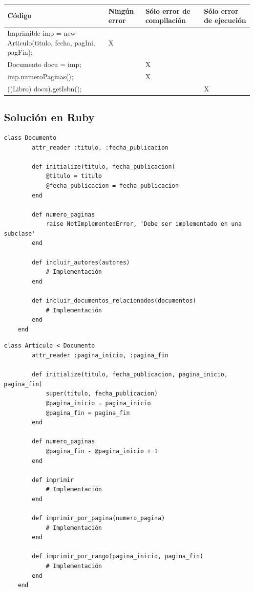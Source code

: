 \documentclass[a4paper,12pt]{article}
\begin{document}
\begin{table}[H]
    \centering
    \begin{tabular}{|p{4cm}|p{4cm}|p{4cm}|p{4cm}|}
        \hline
        \textbf{Código} & \textbf{Ningún error} & \textbf{Sólo error de compilación} & \textbf{Sólo error de ejecución} \\ \hline
        Imprimible imp = new Articulo(titulo, fecha, pagIni, pagFin); & X &  &  \\ \hline
        Documento docu = imp; &  & X &  \\ \hline
        imp.numeroPaginas(); &  & X &  \\ \hline
        ((Libro) docu).getIsbn(); &  &  & X \\ \hline
    \end{tabular}
\end{table}

\subsection{Solución en Ruby}

\begin{lstlisting}[style=customrb, caption={Clase Documento (cabecera, atributos y cabeceras de los métodos)}]
    class Documento
        attr_reader :titulo, :fecha_publicacion

        def initialize(titulo, fecha_publicacion)
            @titulo = titulo
            @fecha_publicacion = fecha_publicacion
        end

        def numero_paginas
            raise NotImplementedError, 'Debe ser implementado en una subclase'
        end

        def incluir_autores(autores)
            # Implementación
        end

        def incluir_documentos_relacionados(documentos)
            # Implementación
        end
    end
\end{lstlisting}

\begin{lstlisting}[style=customrb, caption={Clase Articulo (cabecera, atributos y cabeceras de los métodos), constructor de la clase Artículo}]
    class Articulo < Documento
        attr_reader :pagina_inicio, :pagina_fin

        def initialize(titulo, fecha_publicacion, pagina_inicio, pagina_fin)
            super(titulo, fecha_publicacion)
            @pagina_inicio = pagina_inicio
            @pagina_fin = pagina_fin
        end

        def numero_paginas
            @pagina_fin - @pagina_inicio + 1
        end

        def imprimir
            # Implementación
        end

        def imprimir_por_pagina(numero_pagina)
            # Implementación
        end

        def imprimir_por_rango(pagina_inicio, pagina_fin)
            # Implementación
        end
    end
\end{lstlisting}
\end{document}
